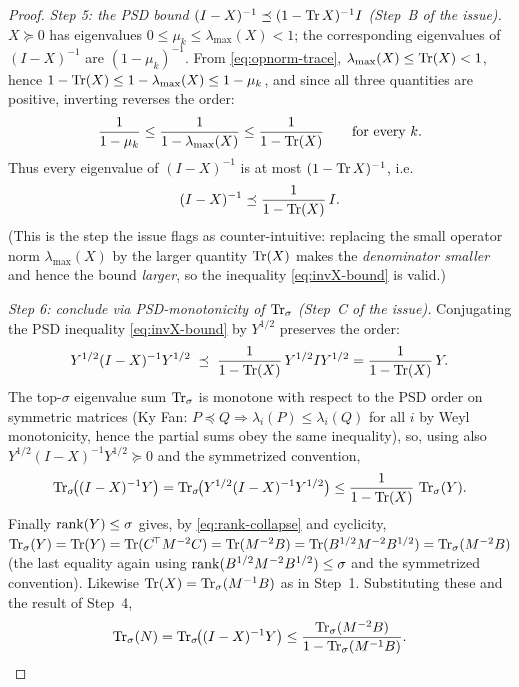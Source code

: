 \begin{proof}
\medskip\noindent\emph{Step 5: the PSD bound $(I-X)^{-1}\preceq(1-\operatorname{Tr} X)^{-1}I$
(Step~B of the issue).}\quad
$X\succeq0$ has eigenvalues $0\le\mu_k\le\lambda_{\max}(X)<1$; the corresponding
eigenvalues of $(I-X)^{-1}$ are $(1-\mu_k)^{-1}$. From \eqref{eq:opnorm-trace},
$\lambda_{\max}(X)\le\operatorname{Tr}(X)<1$, hence
$1-\operatorname{Tr}(X)\le 1-\lambda_{\max}(X)\le 1-\mu_k$, and since all three quantities
are positive, inverting reverses the order:
\[
  \frac{1}{1-\mu_k}\le\frac{1}{1-\lambda_{\max}(X)}\le\frac{1}{1-\operatorname{Tr}(X)}
  \qquad\text{for every }k.
\]
Thus every eigenvalue of $(I-X)^{-1}$ is at most $(1-\operatorname{Tr} X)^{-1}$, i.e.
\begin{equation}\label{eq:invX-bound}
  (I-X)^{-1}\preceq \frac{1}{1-\operatorname{Tr}(X)}\,I .
\end{equation}
(This is the step the issue flags as counter-intuitive: replacing the small
operator norm $\lambda_{\max}(X)$ by the larger quantity $\operatorname{Tr}(X)$ makes the
\emph{denominator smaller} and hence the bound \emph{larger}, so the
inequality \eqref{eq:invX-bound} is valid.)

\medskip\noindent\emph{Step 6: conclude via PSD-monotonicity of $\operatorname{Tr}_{\sigma}$
(Step~C of the issue).}\quad
Conjugating the PSD inequality \eqref{eq:invX-bound} by $Y^{1/2}$ preserves the
order:
\[
  Y^{1/2}(I-X)^{-1}Y^{1/2}\;\preceq\;\frac{1}{1-\operatorname{Tr}(X)}\,Y^{1/2}IY^{1/2}
   =\frac{1}{1-\operatorname{Tr}(X)}\,Y .
\]
The top-$\sigma$ eigenvalue sum $\operatorname{Tr}_{\sigma}$ is monotone with respect to the PSD
order on symmetric matrices (Ky Fan: $P\preceq Q\Rightarrow\lambda_i(P)\le
\lambda_i(Q)$ for all $i$ by Weyl monotonicity, hence the partial sums obey the
same inequality), so, using also $Y^{1/2}(I-X)^{-1}Y^{1/2}\succeq0$ and the
symmetrized convention,
\[
  \operatorname{Tr}_{\sigma}\!\bigl((I-X)^{-1}Y\bigr)
   =\operatorname{Tr}_{\sigma}\!\bigl(Y^{1/2}(I-X)^{-1}Y^{1/2}\bigr)
   \le \frac{1}{1-\operatorname{Tr}(X)}\,\operatorname{Tr}_{\sigma}(Y).
\]
Finally $\operatorname{rank}(Y)\le\sigma$ gives, by \eqref{eq:rank-collapse} and
cyclicity, $\operatorname{Tr}_{\sigma}(Y)=\operatorname{Tr}(Y)=\operatorname{Tr}(C^{\!\top}M^{-2}C)=\operatorname{Tr}(M^{-2}B)
=\operatorname{Tr}(B^{1/2}M^{-2}B^{1/2})=\operatorname{Tr}_{\sigma}(M^{-2}B)$ (the last equality again using
$\operatorname{rank}(B^{1/2}M^{-2}B^{1/2})\le\sigma$ and the symmetrized convention).
Likewise $\operatorname{Tr}(X)=\operatorname{Tr}_{\sigma}(M^{-1}B)$ as in Step~1. Substituting these and the
result of Step~4,
\begin{equation}\label{eq:N-final}
  \operatorname{Tr}_{\sigma}(N)=\operatorname{Tr}_{\sigma}\!\bigl((I-X)^{-1}Y\bigr)
   \le \frac{\operatorname{Tr}_{\sigma}(M^{-2}B)}{1-\operatorname{Tr}_{\sigma}(M^{-1}B)} .
\end{equation}


\end{proof}
